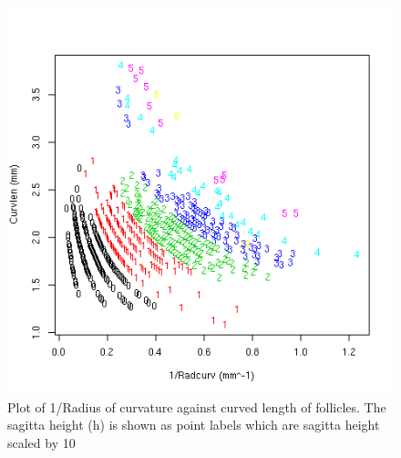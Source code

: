 %

\begin{figure}[!h]
  \centering
  \includegraphics[width=1.0\textwidth]{curvxcurvlenxh.png}
  \caption{Plot of  1/Radius of curvature against curved length of follicles. The sagitta height (h) is shown as point labels which are sagitta height scaled by 10}
  \label{fig:curvxcurvlenxh}
\end{figure}

%

